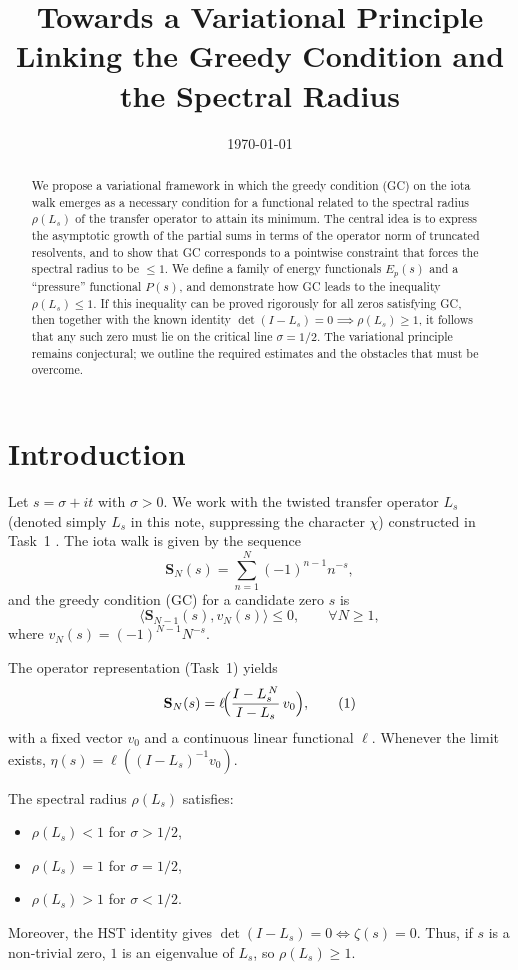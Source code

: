 \documentclass[11pt,a4paper]{article}
\title{\bf Towards a Variational Principle Linking the Greedy Condition and the Spectral Radius}
\author{}
\date{\today}
\begin{document}
\maketitle

\begin{abstract}
We propose a variational framework in which the greedy condition (GC) on the iota walk emerges as a necessary condition for a functional related to the spectral radius $\rho(L_s)$ of the transfer operator to attain its minimum.  The central idea is to express the asymptotic growth of the partial sums in terms of the operator norm of truncated resolvents, and to show that GC corresponds to a pointwise constraint that forces the spectral radius to be $\le 1$.  We define a family of energy functionals $E_p(s)$ and a ``pressure'' functional $P(s)$, and demonstrate how GC leads to the inequality $\rho(L_s) \le 1$.  If this inequality can be proved rigorously for all zeros satisfying GC, then together with the known identity $\det(I-L_s)=0 \implies \rho(L_s)\ge 1$, it follows that any such zero must lie on the critical line $\sigma = 1/2$.  The variational principle remains conjectural; we outline the required estimates and the obstacles that must be overcome.
\end{abstract}

\section{Introduction}
Let $s = \sigma + it$ with $\sigma > 0$.  We work with the twisted transfer operator $L_s$ (denoted simply $L_s$ in this note, suppressing the character $\chi$) constructed in Task~1 \cite{Task1}.  The iota walk is given by the sequence
\[
\mathbf{S}_N(s) = \sum_{n=1}^{N} (-1)^{n-1} n^{-s},
\]
and the greedy condition (GC) for a candidate zero $s$ is
\[
\langle \mathbf{S}_{N-1}(s), v_N(s) \rangle \le 0, \qquad \forall N\ge 1,
\tag{GC}
\]
where $v_N(s) = (-1)^{N-1} N^{-s}$.

The operator representation (Task~1) yields
\[
\mathbf{S}_N(s) = \ell\!\Bigl( \frac{I - L_s^{\,N}}{I - L_s} \, v_0 \Bigr),
\tag{1}
\]
with a fixed vector $v_0$ and a continuous linear functional $\ell$.  Whenever the limit exists, $\eta(s) = \ell( (I - L_s)^{-1} v_0 )$.

The spectral radius $\rho(L_s)$ satisfies:
\begin{itemize}
\item $\rho(L_s) < 1$ for $\sigma > 1/2$,
\item $\rho(L_s) = 1$ for $\sigma = 1/2$,
\item $\rho(L_s) > 1$ for $\sigma < 1/2$.
\end{itemize}
Moreover, the HST identity gives $\det(I - L_s) = 0 \iff \zeta(s) = 0$.  Thus, if $s$ is a non‑trivial zero, $1$ is an eigenvalue of $L_s$, so $\rho(L_s) \ge 1$.
\end{document}
